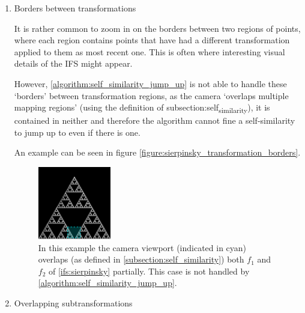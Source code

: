 \documentclass[11pt]{article}
\begin{document}
\begin{enumerate}
\item Borders between transformations
\label{sec:org8cd0fea}

It is rather common to zoom in on the borders between two regions of points, where each region contains points that have had a different transformation applied to them as most recent one. 
This is often where interesting visual details of the IFS might appear.

However, \autoref{algorithm:self_similarity_jump_up} is not able to handle these `borders' between transformation regions,
as the camera `overlaps multiple mapping regions' (using the definition of subsection:self\textsubscript{similarity}),
it is contained in neither and therefore the algorithm cannot fine a self-similarity to jump up to even if there is one.

An example can be seen in figure \autoref{figure:sierpinsky_transformation_borders}.

\begin{figure}
\centering
\includegraphics[width=0.3\textwidth]{figures/sierpinsky_transformation_borders}
\caption{In this example the camera viewport (indicated in cyan) overlaps (as defined in \autoref{subsection:self_similarity}) both $f_1$ and $f_2$ of \autoref{ifs:sierpinsky} partially. This case is not handled by \autoref{algorithm:self_similarity_jump_up}. }
\label{figure:sierpinsky_transformation_borders}
\end{figure}

\item Overlapping subtransformations
\label{sec:org46123c8}


\end{enumerate}
\end{document}

